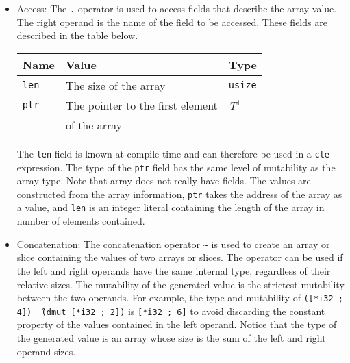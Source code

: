 \begin{itemize}
\item Access: The \texttt{.} operator is used to access fields that describe the
  array value. The right operand is the name of the field to be accessed. These
  fields are described in the table below.

  \begin{center}\begin{adjustbox}{max width=\linewidth}
      \begin{threeparttable}
        \begin{tabular}{|l|ll|}
          \hline
          Name & Value & Type\\
          \hline
          \hline
          \texttt{len} & The size of the array & \texttt{usize} \\
          \texttt{ptr} & The pointer to the first element  & \textit{T}$^{1^{\phantom{J}}}$\\
          & of the array & \\
          \hline
        \end{tabular}
      \end{threeparttable}
\end{adjustbox}\end{center}

The \texttt{len} field is known at compile time and can therefore be used in
a \texttt{cte} expression. The type of the \texttt{ptr} field has the same
level of mutability as the array type. Note that array does not really have
fields. The values are constructed from the array information, \texttt{ptr}
takes the address of the array as a value, and \texttt{len} is an integer
literal containing the length of the array in number of elements contained.

\item Concatenation: The concatenation operator \texttt{\~} is used to create an
  array or slice containing the values of two arrays or slices. The operator can
  be used if the left and right operands have the same internal type, regardless
  of their relative sizes. The mutability of the generated value is the
  strictest mutability between the two operands. For example, the type and
  mutability of \texttt{([*i32 ; 4]) \~\ (dmut [*i32 ; 2])} is \texttt{[*i32 ;
      6]} to avoid discarding the constant property of the values contained in
  the left operand. Notice that the type of the generated value is an array
  whose size is the sum of the left and right operand sizes.


\end{itemize}
